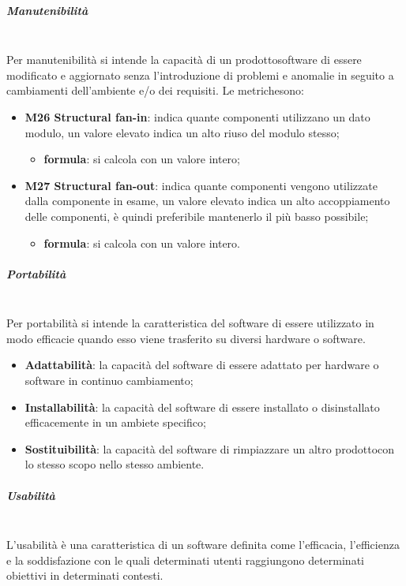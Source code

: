 		\subparagraph{Manutenibilità} \mbox{}\\[1mm]
		Per manutenibilità si intende la capacità di un prodotto\glosp software di essere modificato e aggiornato senza l'introduzione di problemi e anomalie in seguito a cambiamenti dell'ambiente e/o dei requisiti.
		Le metriche\glosp sono:
		\begin{itemize}
			\item \textbf{M26 Structural fan-in}: indica quante componenti utilizzano un dato modulo, un valore elevato indica un alto riuso del modulo stesso;
			\begin{itemize}
				\item[] \textbf{formula}: si calcola con un valore intero;
			\end{itemize}
			\item \textbf{M27 Structural fan-out}: indica quante componenti vengono utilizzate dalla componente in esame, un valore elevato indica un alto accoppiamento delle componenti, è quindi preferibile mantenerlo il più basso possibile;
			\begin{itemize}
				\item[] \textbf{formula}: si calcola con un valore intero.
			\end{itemize}
		\end{itemize}
		\subparagraph{Portabilità} \mbox{}\\ 
		Per portabilità si intende la caratteristica del software di essere utilizzato in modo efficacie quando esso viene trasferito su diversi hardware o software.
		\begin{itemize}
			\item \textbf{Adattabilità}: la capacità del software di essere adattato per hardware o software in continuo cambiamento;
			\item \textbf{Installabilità}: la capacità del software di essere installato o disinstallato efficacemente in un ambiete specifico;
			\item \textbf{Sostituibilità}: la capacità del software di rimpiazzare un altro prodotto\glosp con lo stesso scopo nello stesso ambiente.
		\end{itemize}
	
		\subparagraph{Usabilità} \mbox{}\\[1mm]
		L'usabilità è una caratteristica di un software definita come l'efficacia, l'efficienza e la soddisfazione con le quali determinati utenti raggiungono determinati obiettivi in determinati contesti.

